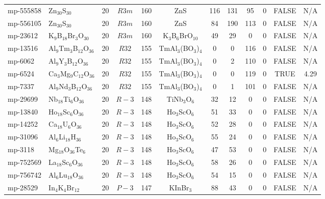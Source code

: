 {\begin{longtable}{llcccccccccc}
    mp-555858 & Zn$_{30}$S$_{30}$ & 20    & $R3m$ & 160   & ZnS   & 116   & 131   & 95    & 0     & FALSE & N/A \\
    mp-556105 & Zn$_{30}$S$_{30}$ & 20    & $R3m$ & 160   & ZnS   & 84    & 190   & 113   & 0     & FALSE & N/A \\
    mp-23612 & K$_{9}$B$_{18}$Br$_{3}$O$_{30}$ & 20    & $R3m$ & 160   & K$_{3}$B$_{6}$BrO$_{10}$ & 49    & 29    & 0     & 0     & FALSE & N/A \\
    mp-13516 & Al$_{9}$Tm$_{3}$B$_{12}$O$_{36}$ & 20    & $R32$ & 155   & TmAl$_{3}$(BO$_{3}$)$_{4}$ & 0     & 0     & 116   & 0     & FALSE & N/A \\
    mp-6062 & Al$_{9}$Y$_{3}$B$_{12}$O$_{36}$ & 20    & $R32$ & 155   & TmAl$_{3}$(BO$_{3}$)$_{4}$ & 0     & 2     & 110   & 0     & FALSE & N/A \\
    mp-6524 & Ca$_{3}$Mg$_{9}$C$_{12}$O$_{36}$ & 20    & $R32$ & 155   & TmAl$_{3}$(BO$_{3}$)$_{4}$ & 0     & 0     & 119   & 0     & TRUE  & 4.29  \\
    mp-7337 & Al$_{9}$Nd$_{3}$B$_{12}$O$_{36}$ & 20    & $R32$ & 155   & TmAl$_{3}$(BO$_{3}$)$_{4}$ & 0     & 1     & 101   & 0     & FALSE & N/A \\
    mp-29699 & Nb$_{18}$Ti$_{6}$O$_{36}$ & 20    & $R-3$ & 148   & TiNb$_{3}$O$_{6}$ & 32    & 12    & 0     & 0     & FALSE & N/A \\
    mp-13840 & Ho$_{18}$Sc$_{6}$O$_{36}$ & 20    & $R-3$ & 148   & Ho$_{3}$ScO$_{6}$ & 51    & 33    & 0     & 0     & FALSE & N/A \\
    mp-14252 & Ca$_{18}$U$_{6}$O$_{36}$ & 20    & $R-3$ & 148   & Ho$_{3}$ScO$_{6}$ & 52    & 28    & 0     & 0     & FALSE & N/A \\
    mp-31096 & Al$_{6}$Li$_{18}$H$_{36}$ & 20    & $R-3$ & 148   & Ho$_{3}$ScO$_{6}$ & 55    & 24    & 0     & 0     & FALSE & N/A \\
    mp-3118 & Mg$_{18}$O$_{36}$Te$_{6}$ & 20    & $R-3$ & 148   & Ho$_{3}$ScO$_{6}$ & 47    & 53    & 0     & 0     & FALSE & N/A \\
    mp-752569 & La$_{18}$Sc$_{6}$O$_{36}$ & 20    & $R-3$ & 148   & Ho$_{3}$ScO$_{6}$ & 58    & 26    & 0     & 0     & FALSE & N/A \\
    mp-756742 & Al$_{6}$Lu$_{18}$O$_{36}$ & 20    & $R-3$ & 148   & Ho$_{3}$ScO$_{6}$ & 54    & 15    & 0     & 0     & FALSE & N/A \\
    mp-28529 & In$_{4}$K$_{4}$Br$_{12}$ & 20    & $P-3$ & 147   & KInBr$_{3}$ & 88    & 43    & 0     & 0     & FALSE & N/A \\

\end{longtable}}

